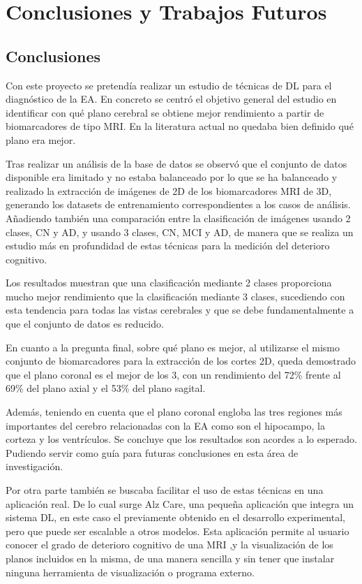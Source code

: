 \chapter{Conclusiones y Trabajos Futuros}\label{ch:conclusiones-y-trabajos-futuros}

\section{Conclusiones}\label{sec:conclusiones}
Con este proyecto se pretendía realizar un estudio de técnicas de DL para el diagnóstico de la EA.
En concreto se centró el objetivo general del estudio en identificar con qué plano cerebral se obtiene mejor rendimiento
a partir de biomarcadores de tipo MRI. En la literatura actual no quedaba bien definido qué plano era mejor.

Tras realizar un análisis de la base de datos se observó que el conjunto de datos disponible era limitado y no estaba
balanceado por lo que se ha balanceado y realizado la extracción de imágenes de 2D de los biomarcadores MRI de 3D,
generando los datasets de entrenamiento correspondientes a los casos de análisis.
Añadiendo también una comparación entre la clasificación de imágenes usando 2 clases, CN y AD, y usando 3 clases, CN,
MCI y AD, de manera que se realiza un estudio más en profundidad de estas técnicas para la medición del deterioro
cognitivo.

Los resultados muestran que una clasificación mediante 2 clases proporciona mucho mejor rendimiento que la clasificación
mediante 3 clases, sucediendo con esta tendencia para todas las vistas cerebrales y que se debe fundamentalmente a que
el conjunto de datos es reducido.

En cuanto a la pregunta final, sobre qué plano es mejor, al utilizarse el mismo conjunto de biomarcadores para la
extracción de los cortes 2D, queda demostrado que el plano coronal es el mejor de los 3, con un rendimiento del 72\%
frente al 69\% del plano axial y el 53\% del plano sagital.

Además, teniendo en cuenta que el plano coronal engloba las tres regiones más importantes del cerebro relacionadas con
la EA como son el hipocampo, la corteza y los ventrículos.
Se concluye que los resultados son acordes a lo esperado.
Pudiendo servir como guía para futuras conclusiones en esta área de investigación.

Por otra parte también se buscaba facilitar el uso de estas técnicas en una aplicación real.
De lo cual surge Alz Care, una pequeña aplicación que integra un sistema DL, en este caso el
previamente obtenido en el desarrollo experimental, pero que puede ser escalable a otros modelos.
Esta aplicación permite al usuario conocer el grado de deterioro cognitivo de una MRI ,y la visualización
de los planos incluidos en la misma, de una manera sencilla y sin tener que instalar ninguna herramienta de
visualización o programa externo.

